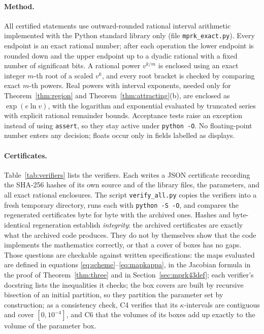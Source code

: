 \documentclass[11pt,a4paper]{article}
\theoremstyle{plain}
\theoremstyle{definition}
\begin{document}
\paragraph{Method.} All certified statements use outward-rounded rational interval arithmetic implemented with the Python standard library only (file \texttt{mprk\_exact.py}). Every endpoint is an exact rational number; after each operation the lower endpoint is rounded down and the upper endpoint up to a dyadic rational with a fixed number of significant bits. A rational power $v^{k/m}$ is enclosed using an exact integer $m$-th root of a scaled $v^k$, and every root bracket is checked by comparing exact $m$-th powers. Real powers with interval exponents, needed only for Theorem~\ref{thm:region} and Theorem~\ref{thm:attracting}(b), are enclosed as $\exp(e\ln v)$, with the logarithm and exponential evaluated by truncated series with explicit rational remainder bounds. Acceptance tests raise an exception instead of using \texttt{assert}, so they stay active under \texttt{python -O}. No floating-point number enters any decision; floats occur only in fields labelled as displays.

\paragraph{Certificates.} Table~\ref{tab:verifiers} lists the verifiers. Each writes a JSON certificate recording the SHA-256 hashes of its own source and of the library files, the parameters, and all exact rational enclosures. The script \texttt{verify\_all.py} copies the verifiers into a fresh temporary directory, runs each with \texttt{python -S -O}, and compares the regenerated certificates byte for byte with the archived ones. Hashes and byte-identical regeneration establish \emph{integrity}: the archived certificates are exactly what the archived code produces. They do not by themselves show that the code implements the mathematics correctly, or that a cover of boxes has no gaps. Those questions are checkable against written specifications: the maps evaluated are defined in equations \eqref{eq:scheme}--\eqref{eq:mapkappa}, in the Jacobian formula in the proof of Theorem~\ref{thm:three} and in Section~\ref{sec:mprk43def}; each verifier's docstring lists the inequalities it checks; the box covers are built by recursive bisection of an initial partition, so they partition the parameter set by construction; as a consistency check, C4 verifies that its $\kappa$-intervals are contiguous and cover $[0,10^{-4}]$, and C6 that the volumes of its boxes add up exactly to the volume of the parameter box.
\end{document}
